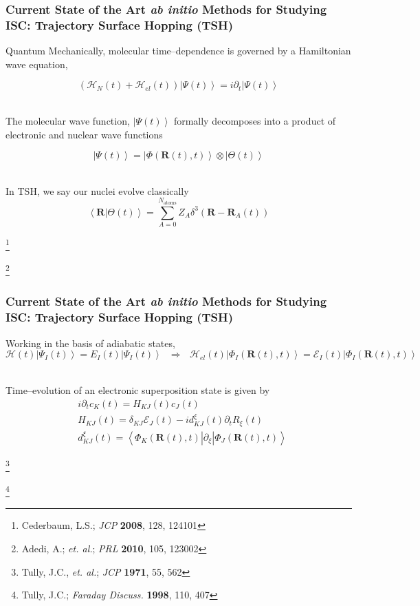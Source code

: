 \documentclass[usepdftitle=false,10pt]{beamer}
\newcommand{\bpar}[1]{\left( #1 \right)}                  %
\newcommand{\ket}[1]{\left\vert #1 \right\rangle}         %
\newcommand{\inner}[2]{\left\langle #1 \left\vert\right. #2 \right\rangle}            %
\newcommand{\innerop}[3]{\left\langle #1 \left\vert #2 \right\vert #3 \right\rangle}  %
\newcommand*\vc[1]{\boldsymbol{#1}}
\newcommand*\op[1]{\mathcal{#1}}
\newcommand\blfootnote[1]{%
  \begingroup
  \renewcommand\thefootnote{}\footnote{#1}%
  \addtocounter{footnote}{-1}%
  \endgroup
}
\begin{document}
\begin{frame}
  \frametitle{Current State of the Art \emph{ab initio} Methods for Studying 
  ISC: Trajectory Surface Hopping (TSH)}

  Quantum Mechanically, molecular time--dependence is governed by a Hamiltonian
  wave equation,

  \begin{equation*}
    \bpar{\op{H}_N(t) + \op{H}_{el}(t)} \ket{\Psi (t)} = i\partial_t \ket{\Psi(t)}
  \end{equation*}

  ~\\
  The molecular wave function, $\ket{\Psi(t)}$ formally decomposes into a product
  of electronic and nuclear wave functions

  \begin{equation*} 
    \ket{\Psi (t)} = \ket{\Phi(\vc{R}(t),t)}\otimes\ket{\Theta(t)} 
  \end{equation*} 

  ~\\
  In TSH, we say our nuclei evolve classically
  \begin{equation*}
    \inner{\vc{R}}{\Theta (t)} = \sum_{A = 0}^{N_\mathrm{atoms}} 
    Z_A\delta^3(\vc{R} - \vc{R}_A(t))
  \end{equation*}

  \vspace{-0.5cm}
  \blfootnote{\tiny Cederbaum, L.S.; \emph{JCP} \textbf{2008}, 128, 124101}
  \blfootnote{\tiny Adedi, A.; \emph{et. al.}; \emph{PRL} \textbf{2010}, 105, 123002}
\end{frame}

\begin{frame}
  \frametitle{Current State of the Art \emph{ab initio} Methods for Studying 
  ISC: Trajectory Surface Hopping (TSH)}

  Working in the basis of adiabatic states,
  \begin{equation*}
    \op{H}(t) \ket{\Psi_I (t)} = E_I(t) \ket{\Psi_I (t)}
    \text{ }\Longrightarrow \text{ }
    \op{H}_{el}(t)\ket{\Phi_I(\vc{R}(t),t)} = 
      \mathcal{E}_I(t)\ket{\Phi_I(\vc{R}(t),t)}
  \end{equation*}
  
  ~\\
  Time--evolution of an electronic superposition state is given by
  \begin{align*}
    &i  \partial_t c_K(t) = H_{KJ}(t) c_J(t) \\
    &H_{KJ}(t) = \delta_{KJ}\mathcal{E}_J(t) - i d_{KJ}^\xi (t) \partial_t R_{\xi}(t) \\
    &d_{KJ}^\xi (t) = \innerop{\Phi_K(\vc{R}(t),t)}{\partial_\xi}{\Phi_J(\vc{R}(t),t)}
  \end{align*}

  \blfootnote{\tiny Tully, J.C., \emph{et. al.}; \emph{JCP} \textbf{1971}, 55, 562}
  \blfootnote{\tiny Tully, J.C.; \emph{Faraday Discuss.} \textbf{1998}, 110, 407}
\end{frame}
\end{document}
